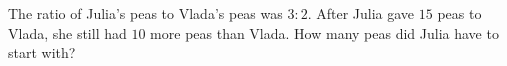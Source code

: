 The ratio of Julia's peas to Vlada's peas was $3:2$. After Julia gave $15$ peas to Vlada, she still had $10$ more peas than Vlada. How many peas did Julia have to start with?
